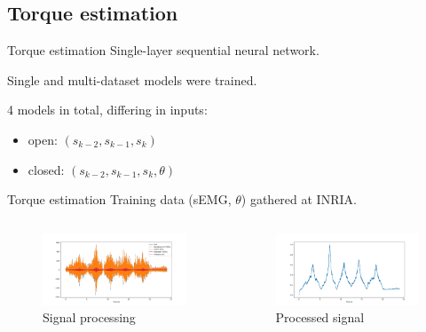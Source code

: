 \documentclass[aspectratio=169]{beamer}
\begin{document}
\subsection{Torque estimation}
\begin{frame}{Torque estimation}
Single-layer sequential neural network.  

\bigskip

Single and multi-dataset models were trained.  

4 models in total, differing in inputs:
\begin{itemize}
  \item open: $(s_{k-2},s_{k-1},s_k)$
  \item closed: $(s_{k-2},s_{k-1},s_k,\theta)$
\end{itemize}
\end{frame}
\begin{frame}{Torque estimation}
	Training data (sEMG, $\theta$) gathered at INRIA.

	\begin{columns}
	\begin{column}{0.5\textwidth}

	\begin{figure}[htbp]
	  \centering
	  \includegraphics[width=\linewidth]{processing.png}
	  \caption{Signal processing}
	  \label{fig:processing}
	\end{figure}
	\end{column}
	\begin{column}{0.4\textwidth}
	\begin{figure}[htbp]
	  \centering
	  \includegraphics[width=\linewidth]{processed.png}
	  \caption{Processed signal}
	  \label{fig:processed}
	\end{figure}
	\end{column}
	\end{columns}
\end{frame}
\end{document}
